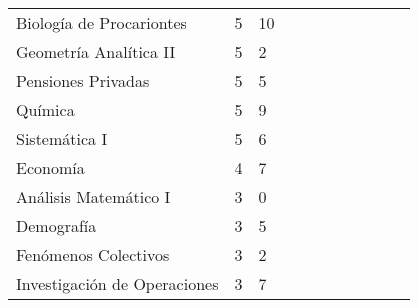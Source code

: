 \begin{table}[h!]
\begin{tabular}{l|ll|llllllll}
Biología de Procariontes     & 5        & 10                  &                     &                     &                     &                     &                     &                     &                     & \cellcolor{blue!25} \\
Geometría Analítica II       & 5        & 2                   & \cellcolor{blue!25} &                     & \cellcolor{blue!25} & \cellcolor{blue!25} &                     &                     & \cellcolor{blue!25} &                     \\
Pensiones Privadas           & 5        & 5                   & \cellcolor{blue!25} &                     &                     &                     &                     &                     &                     &                     \\
Química                      & 5        & 9                   &                     &                     &                     &                     &                     &                     &                     & \cellcolor{blue!25} \\
Sistemática I                & 5        & 6                   &                     &                     &                     &                     &                     &                     &                     & \cellcolor{blue!25} \\
Economía                     & 4        & 7                   & \cellcolor{blue!25} &                     &                     &                     &                     &                     &                     &                     \\
Análisis Matemático I        & 3        & 0                   & \cellcolor{blue!25} &                     &                     & \cellcolor{blue!25} &                     &                     & \cellcolor{blue!25} &                     \\
Demografía                   & 3        & 5                   & \cellcolor{blue!25} &                     &                     &                     &                     &                     &                     &                     \\
Fenómenos Colectivos         & 3        & 2                   &                     &                     & \cellcolor{blue!25} &                     & \cellcolor{blue!25} & \cellcolor{blue!25} &                     &                     \\
Investigación de Operaciones & 3        & 7                   & \cellcolor{blue!25} &                     &                     &                     &                     &                     & \cellcolor{blue!25} &                     \\

\end{tabular}
\end{table}
